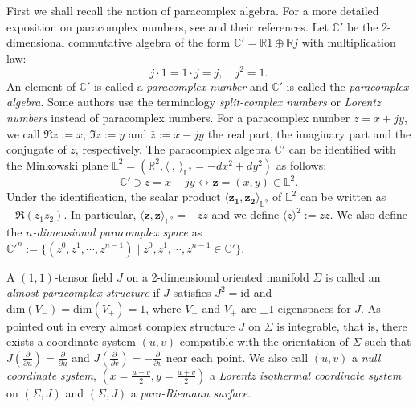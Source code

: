 \documentclass[11pt,reqno]{amsart}
\theoremstyle{plain} %
\theoremstyle{definition}
\begin{document}
First we shall recall the notion of paracomplex algebra. For a more detailed exposition on paracomplex numbers, see \cite{CFG,IT,Konderak} and their references. Let $\mathbb{C}'$ be the $2$-dimensional commutative algebra of the form $\mathbb{C}'=\mathbb{R}1\oplus \mathbb{R} j$ with multiplication law:
\begin{equation*}
j\cdot 1=1\cdot j=j,\quad j^2=1.
\end{equation*}
An element of $\mathbb{C}'$ is called a {\it paracomplex number} and $\mathbb{C}'$ is called the {\it paracomplex algebra}. Some authors use the terminology {\it split-complex numbers} or {\it Lorentz numbers} instead of paracomplex numbers. For a paracomplex number $z=x+jy$, we call $\Re{z}:=x$, $\Im{z}:=y$ and $\bar{z}:=x-jy$ the real part, the imaginary part and the conjugate of $z$, respectively. The paracomplex algebra $\mathbb{C}'$ can be identified with the Minkowski plane $\mathbb{L}^2=(\mathbb{R}^2, \langle \ ,\ \rangle _{\mathbb{L}^2}=-dx^2+dy^2)$ as follows:
\begin{equation*}
\mathbb{C}' \ni z=x+jy \longleftrightarrow \bm{z}=(x, y)\in \mathbb{L}^2.
\end{equation*}
Under the identification, the scalar product $\langle \bm{z_1}, \bm{z_2}\rangle_{\mathbb{L}^2}$ of $\mathbb{L}^2$ can be written as $-\Re{(\bar{z}_1z_2)}$. In particular, $\langle \bm{z},\bm{z}\rangle _{\mathbb{L}^2}=-z\bar{z}$ and we define $\langle z \rangle^2:=z\bar{z}$. We also define the {\it $n$-dimensional paracomplex space} as ${\mathbb{C}'}^n:=\{(z^0,z^1,\cdots,z^{n-1})\mid z^0, z^1,\cdots, z^{n-1}\in \mathbb{C}'\}$. 

A $(1,1)$-tensor field $J$ on a 2-dimensional oriented manifold $\Sigma$ is called an {\it almost paracomplex structure} if $J$ satisfies $J^2=\mathrm{id}$ and $\mathrm {dim}(V_{-})=\mathrm{dim}(V_{+})=1$, where $V_-$ and $V_+$ are $\pm 1$-eigenspaces for $J$. As pointed out in \cite{IT,W} every almost complex structure $J$ on $\Sigma$ is integrable, that is, there exists a coordinate system $(u,v)$ compatible with the orientation of $\Sigma$ such that $J(\frac{\partial}{\partial u})=\frac{\partial}{\partial u}$ and $J(\frac{\partial}{\partial v})=-\frac{\partial}{\partial v}$ near each point. We also call $(u,v)$ a {\it null coordinate system}, $(x=\frac{u-v}{2},y=\frac{u+v}{2})$ a {\it Lorentz isothermal coordinate system} on $(\Sigma, J)$ and $(\Sigma, J)$ a {\it para-Riemann surface}. 
\end{document}
